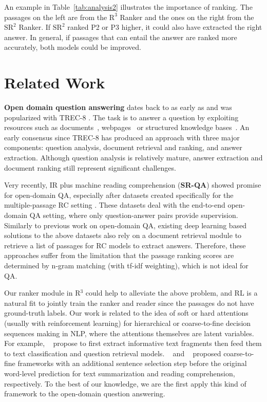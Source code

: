 \documentclass[letterpaper]{article} %
\begin{document}
An example in Table~\ref{tab:analysis2} illustrates the importance of ranking.  The passages on the left are from the $\text{R}^3$ Ranker and the ones on the right from the $\text{SR}^2$ Ranker. If $\text{SR}^2$ ranked P2 or P3 higher, it could also have extracted the right answer. In general, if passages that can entail the answer are ranked more accurately, both models could be improved. 


\section{Related Work}

\textbf{Open domain question answering} dates back to as early as \cite{green1961baseball} and was popularized with TREC-8 \cite{voorhees1999trec}. The task is to answer a question by exploiting resources such as
documents~\cite{voorhees1999trec}, webpages~\cite{kwok2001scaling,chen2017discriminative} 
or structured knowledge bases~\cite{berant2013semantic,bordes2015large,yu2017improved}.
An early consensus since TREC-8 has produced an approach with three major components: question analysis, document retrieval and ranking, and answer extraction. Although question analysis is relatively mature, answer extraction and document ranking still represent significant challenges.

Very recently, IR plus machine reading comprehension (\textbf{SR-QA}) showed promise for open-domain QA, especially after datasets created specifically for the multiple-passage RC setting \cite{nguyen2016ms,chen2017reading,JoshiTriviaQA2017,dunn2017searchqa,dhingra2017quasar}.
These datasets deal with the end-to-end open-domain QA setting, where  %
only question-answer pairs provide supervision.
Similarly to previous work on open-domain QA, existing deep learning based solutions to the above datasets also rely on a document retrieval module to retrieve a list of passages for RC models to extract answers.
Therefore, these approaches suffer from the limitation that the passage ranking scores are determined by n-gram matching (with tf-idf weighting), which is not ideal for QA.

Our ranker module in R$^3$
could help to alleviate the above problem, and
RL is a natural fit to jointly train the ranker and reader since the passages do not have ground-truth labels.
Our work is related to the idea of soft or hard attentions (usually with reinforcement learning) for hierarchical or coarse-to-fine decision sequences making in NLP, where the attentions themselves are latent variables. For example, \citeauthor{lei2016rationalizing}~\citeyear{lei2016rationalizing} propose to first extract informative text fragments then feed them to text classification and question retrieval models.
\citeauthor{cheng2016neural}~\citeyear{cheng2016neural} and \citeauthor{choi2017coarse}~\citeyear{choi2017coarse} proposed coarse-to-fine frameworks with an additional sentence selection step before the original word-level prediction for text summarization and reading comprehension, respectively.
To the best of our knowledge, we are the first apply this kind of framework to the open-domain question answering.
\end{document}
